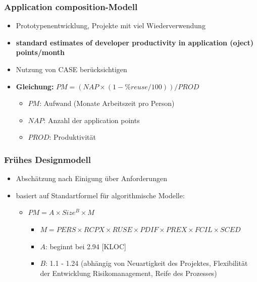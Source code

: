 \subsubsection{Application composition-Modell}
\begin{itemize}
    \item Prototypenentwicklung, Projekte mit viel Wiederverwendung 
    \item \textbf{standard estimates of developer productivity in application (oject) points/month}
    \item Nutzung von CASE berücksichtigen
    \item \textbf{Gleichung:} $PM = (NAP \times (1-\%reuse/100))/PROD$
    \begin{itemize}
        \item $PM$: Aufwand (Monate Arbeitszeit pro Person) 
        \item $NAP$: Anzahl der application points 
        \item $PROD$: Produktivität
    \end{itemize}
\end{itemize}

\subsubsection{Frühes Designmodell}
\begin{itemize}
    \item Abschätzung nach Einigung über Anforderungen 
    \item basiert auf Standartformel für algorithmische Modelle: 
    \begin{itemize}
        \item $PM = A \times Size^{B} \times M$
        \begin{itemize}
            \item $M = PERS \times RCPX \times RUSE \times PDIF \times PREX \times FCIL \times SCED$
            \item $A$: beginnt bei 2.94 [KLOC]
            \item $B$: 1.1 - 1.24 (abhängig von Neuartigkeit des Projektes, Flexibilität der Entwicklung Risikomanagement, Reife des Prozesses)
        \end{itemize}
    \end{itemize}
\end{itemize}

